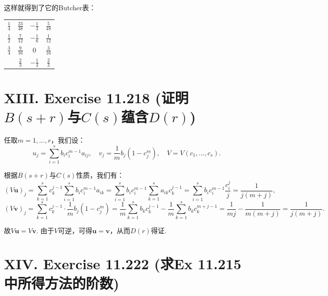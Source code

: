 \documentclass[twoside,a4paper]{article}
\begin{document}
这样就得到了它的Butcher表：
\begin{table}[H]
    \renewcommand\arraystretch{1.5}
    \centering
    \begin{tabular}{c|ccc}
        $\frac{1}{4}$ & $\frac{23}{48}$           & $-\frac{1}{3}$   & $\frac{5}{48}$  \\
        $\frac{1}{2}$ & $\frac{7}{12}$            & $-\frac{1}{6}$ &  $\frac{1}{12}$\\
        $\frac{3}{4}$ & $\frac{9}{16}$            & $0$ & $\frac{3}{16}$ \\ \hline
                    & $\frac{2}{3}$     & $-\frac{1}{3}$      & $\frac{2}{3}$
    \end{tabular}
\end{table}

\section*{XIII. Exercise 11.218 (证明$B(s+r)$与$C(s)$蕴含$D(r)$)}

\;\;\;\;\;\;任取$m=1,...,r$，我们设：
\begin{equation*}
    u_j=\sum_{i=1}^s b_ic_i^{m-1}a_{ij},\quad v_j=\frac{1}{m}b_j(1-c_j^m),\quad V=V(c_1,...,c_s).
\end{equation*}

根据$B(s+r)$与$C(s)$性质，我们有：
\begin{equation*}
    (V\mathbf{u})_j=\sum_{k=1}^s c_k^{j-1}\sum_{i=1}^s b_ic_i^{m-1}a_{ik}=\sum_{i=1}^s b_ic_i^{m-1}\sum_{k=1}^s a_{ik}c_k^{j-1}=\sum_{i=1}^s b_ic_i^{m-1}\frac{c_i^j}{j}=\frac{1}{j(m+j)},
\end{equation*}
\begin{equation*}
    (V\mathbf{v})_j=\sum_{k=1}^s c_k^{j-1}\cdot \frac{1}{m}b_j(1-c_j^m)=\frac{1}{m}\sum_{k=1}^s b_kc_k^{j-1}-\frac{1}{m}\sum_{k=1}^s b_kc_k^{m+j-1}=\frac{1}{mj}-\frac{1}{m(m+j)}=\frac{1}{j(m+j)}.
\end{equation*}

故$V\mathbf{u}=V\mathbf{v}$. 由于$V$可逆，可得$\mathbf{u}=\mathbf{v}$，从而$D(r)$得证.

\section*{XIV. Exercise 11.222 (求Ex 11.215中所得方法的阶数)}
\end{document}
